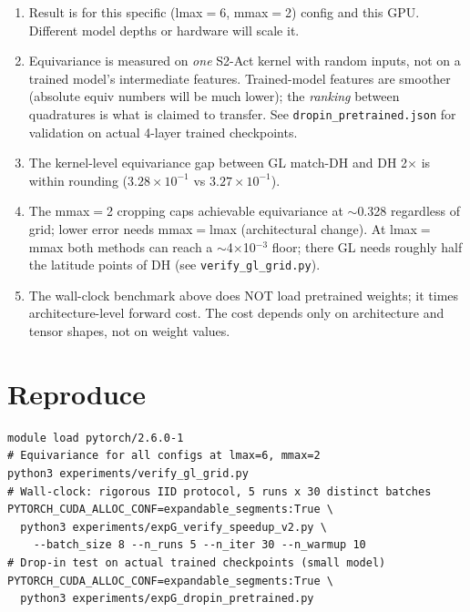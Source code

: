\documentclass[10pt,a4paper]{article}
\begin{document}
\begin{enumerate}\setlength\itemsep{0pt}
\item Result is for this specific (lmax$=$6, mmax$=$2) config and this GPU.
  Different model depths or hardware will scale it.
\item Equivariance is measured on \emph{one} S2-Act kernel with random
  inputs, not on a trained model's intermediate features. Trained-model
  features are smoother (absolute equiv numbers will be much lower); the
  \emph{ranking} between quadratures is what is claimed to transfer.
  See \texttt{dropin\_pretrained.json} for validation on actual
  4-layer trained checkpoints.
\item The kernel-level equivariance gap between GL match-DH and DH 2$\times$
  is within rounding ($3.28\!\times\!10^{-1}$ vs $3.27\!\times\!10^{-1}$).
\item The mmax$=$2 cropping caps achievable equivariance at $\sim$0.328
  regardless of grid; lower error needs mmax$=$lmax (architectural change).
  At lmax$=$mmax both methods can reach a $\sim$4$\times$10$^{-3}$ floor;
  there GL needs roughly half the latitude points of DH (see
  \texttt{verify\_gl\_grid.py}).
\item The wall-clock benchmark above does NOT load pretrained weights; it
  times architecture-level forward cost. The cost depends only on
  architecture and tensor shapes, not on weight values.
\end{enumerate}

\section*{Reproduce}

\begin{lstlisting}
module load pytorch/2.6.0-1
# Equivariance for all configs at lmax=6, mmax=2
python3 experiments/verify_gl_grid.py
# Wall-clock: rigorous IID protocol, 5 runs x 30 distinct batches
PYTORCH_CUDA_ALLOC_CONF=expandable_segments:True \
  python3 experiments/expG_verify_speedup_v2.py \
    --batch_size 8 --n_runs 5 --n_iter 30 --n_warmup 10
# Drop-in test on actual trained checkpoints (small model)
PYTORCH_CUDA_ALLOC_CONF=expandable_segments:True \
  python3 experiments/expG_dropin_pretrained.py
\end{lstlisting}
\end{document}
